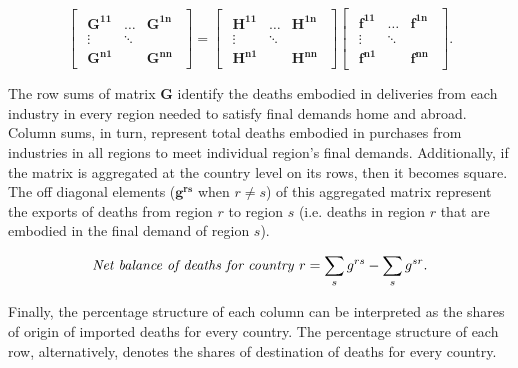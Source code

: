 \documentclass[a4paper,12pt]{article}
\begin{document}
\begin{equation} \begin{bmatrix} \begin{array}{ccc} \mathbf{G^{11}} & \ldots & \mathbf{G^{1n}} \\ \vdots &  \ddots &  \\
\mathbf{G^{n1}} &  & \mathbf{G^{nn}} \end{array} \end{bmatrix} = \begin{bmatrix} \begin{array}{ccc} \mathbf{H^{11}} & \ldots &
\mathbf{H^{1n}} \\ \vdots &  \ddots &  \\ \mathbf{H^{n1}} &  & \mathbf{H^{nn}} \end{array} \end{bmatrix} \begin{bmatrix}
\begin{array}{ccc} \mathbf{f^{11}} & \ldots & \mathbf{f^{1n}} \\ \vdots &  \ddots &  \\ \mathbf{f^{n1}} &  & \mathbf{f^{nn}}
\end{array} \end{bmatrix} . \label{11} \end{equation}

The row sums  of matrix $\textbf{G}$ identify the deaths embodied in deliveries from each industry in every region needed to satisfy final demands home and abroad. Column sums, in turn, represent total deaths embodied in purchases from industries in all regions to meet individual region's final demands. Additionally, if the matrix is aggregated at the country level on its rows, then it becomes square. The off diagonal elements ($\textbf{g}^{\textbf{rs}}$ when $r \not= s$) of this aggregated matrix represent the exports of deaths from region $r$ to region $s$ (i.e. deaths in region $r$ that are embodied in the final demand of region $s$).

\begin{equation}\text{\textit{Net balance of deaths for country} $r$} = \sum_s g^{rs} - \sum_s g^{sr}. \label{12} \end{equation}

Finally, the percentage structure of each column can be interpreted as the shares of origin of imported deaths for every country. The percentage structure of each row, alternatively, denotes the shares of destination of deaths for every country.
\end{document}
